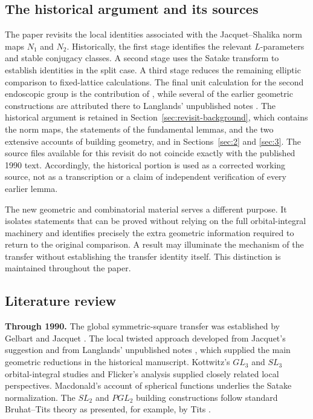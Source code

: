\documentclass[12pt,letterpaper]{amsart}
\numberwithin{equation}{section}
\theoremstyle{definition}
\theoremstyle{plain}
\begin{document}
\subsection{The historical argument and its sources}
\label{sec:0}

The paper revisits the local identities associated with the
Jacquet--Shalika norm maps $N_1$ and $N_2$. Historically, the first
stage identifies the relevant $L$-parameters and stable conjugacy
classes. A second stage uses the Satake transform to establish
identities in the split case. A third stage reduces the remaining
elliptic comparison to fixed-lattice calculations. The final unit
calculation for the second endoscopic group is the contribution of
\cite{Jo90}, while several of the earlier geometric constructions
are attributed there to Langlands' unpublished notes \cite{LaUn}.
The historical argument is retained in
Section~\ref{sec:revisit-background}, which contains the norm maps,
the statements of the fundamental lemmas, and the two extensive
accounts of building geometry, and in Sections~\ref{sec:2} and
\ref{sec:3}.
The source files available for this revisit do not coincide exactly
with the published 1990 text. Accordingly, the historical portion is
used as a corrected working source, not as a transcription or a
claim of independent verification of every earlier lemma.

The new geometric and combinatorial material serves a different
purpose. It isolates statements that can be proved without relying
on the full orbital-integral machinery and identifies precisely the
extra geometric information required to return to the original
comparison. A result may illuminate the mechanism of the transfer
without establishing the transfer identity itself. This distinction
is maintained throughout the paper.

\subsection{Literature review}
\label{sec:revisit-literature}

\textbf{Through 1990.} The global symmetric-square transfer was established
by Gelbart and Jacquet \cite{GJ78}. The local twisted approach developed
from Jacquet's suggestion and from Langlands' unpublished notes
\cite{LaUn}, which supplied the main geometric reductions in the
historical manuscript. Kottwitz's $GL_3$ and $SL_3$ orbital-integral
studies \cite{Ko80,Ko81} and Flicker's analysis \cite{Fl87} supplied
closely related local perspectives. Macdonald's account of spherical
functions \cite{Ma71} underlies the Satake normalization. The
$SL_2$ and $PGL_2$ building constructions follow standard Bruhat--Tits
theory as presented, for example, by Tits \cite{Ti79}.
\end{document}
